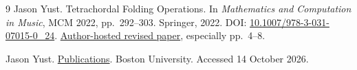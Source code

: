 \documentclass[10pt]{article}
\theoremstyle{remark}
\begin{document}
\begin{thebibliography}{9}
Jason Yust.
\newblock Tetrachordal Folding Operations.
\newblock In \emph{Mathematics and Computation in Music}, MCM 2022,
pp.~292--303. Springer, 2022.
\newblock DOI: \href{https://doi.org/10.1007/978-3-031-07015-0_24}{10.1007/978-3-031-07015-0\_24}.
\newblock \href{https://sites.bu.edu/jyust/files/2022/09/tetrachordalFoldingRev.pdf}{Author-hosted revised paper}, especially pp.~4--8.

Jason Yust.
\newblock \href{https://sites.bu.edu/jyust/Publications/}{Publications}.
\newblock Boston University. Accessed 14 October 2026.
\end{thebibliography}
\end{document}
